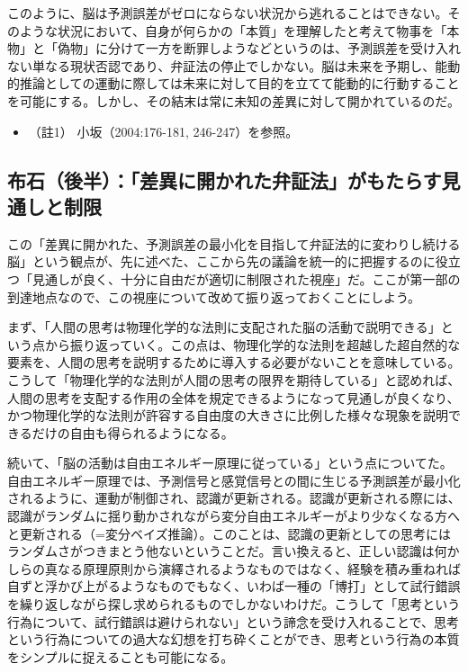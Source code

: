 このように、脳は予測誤差がゼロにならない状況から逃れることはできない。そのような状況において、自身が何らかの「本質」を理解したと考えて物事を「本物」と「偽物」に分けて一方を断罪しようなどというのは、予測誤差を受け入れない単なる現状否認であり、弁証法の停止でしかない。脳は未来を予期し、能動的推論としての運動に際しては未来に対して目的を立てて能動的に行動することを可能にする。しかし、その結末は常に未知の差異に対して開かれているのだ。

\begin{itemize}
\tightlist
\item
  （註1） 小坂（2004:176-181, 246-247）\cite{Kosaka}を参照。
\end{itemize}

\subsection{布石（後半）：「差異に開かれた弁証法」がもたらす見通しと制限}\label{ux5e03ux77f3ux5f8cux534aux5deeux7570ux306bux958bux304bux308cux305fux5f01ux8a3cux6cd5ux304cux3082ux305fux3089ux3059ux898bux901aux3057ux3068ux5236ux9650}

この「差異に開かれた、予測誤差の最小化を目指して弁証法的に変わりし続ける脳」という観点が、先に述べた、ここから先の議論を統一的に把握するのに役立つ「見通しが良く、十分に自由だが適切に制限された視座」だ。ここが第一部の到達地点なので、この視座について改めて振り返っておくことにしよう。

まず、「人間の思考は物理化学的な法則に支配された脳の活動で説明できる」という点から振り返っていく。この点は、物理化学的な法則を超越した超自然的な要素を、人間の思考を説明するために導入する必要がないことを意味している。こうして「物理化学的な法則が人間の思考の限界を期待している」と認めれば、人間の思考を支配する作用の全体を規定できるようになって見通しが良くなり、かつ物理化学的な法則が許容する自由度の大きさに比例した様々な現象を説明できるだけの自由も得られるようになる。

続いて、「脳の活動は自由エネルギー原理に従っている」という点についてた。自由エネルギー原理では、予測信号と感覚信号との間に生じる予測誤差が最小化されるように、運動が制御され、認識が更新される。認識が更新される際には、認識がランダムに揺り動かされながら変分自由エネルギーがより少なくなる方へと更新される（=変分ベイズ推論）。このことは、認識の更新としての思考にはランダムさがつきまとう他ないということだ。言い換えると、正しい認識は何かしらの真なる原理原則から演繹されるようなものではなく、経験を積み重ねれば自ずと浮かび上がるようなものでもなく、いわば一種の「博打」として試行錯誤を繰り返しながら探し求められるものでしかないわけだ。こうして「思考という行為について、試行錯誤は避けられない」という諦念を受け入れることで、思考という行為についての過大な幻想を打ち砕くことができ、思考という行為の本質をシンプルに捉えることも可能になる。

